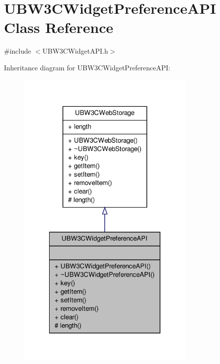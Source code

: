 \hypertarget{class_u_b_w3_c_widget_preference_a_p_i}{\section{U\-B\-W3\-C\-Widget\-Preference\-A\-P\-I Class Reference}
\label{d8/d74/class_u_b_w3_c_widget_preference_a_p_i}
}


{\ttfamily \#include $<$U\-B\-W3\-C\-Widget\-A\-P\-I.\-h$>$}



Inheritance diagram for U\-B\-W3\-C\-Widget\-Preference\-A\-P\-I\-:
\nopagebreak
\begin{figure}[H]
\begin{center}
\leavevmode
\includegraphics[width=248pt]{d9/dde/class_u_b_w3_c_widget_preference_a_p_i__inherit__graph}
\end{center}
\end{figure}


